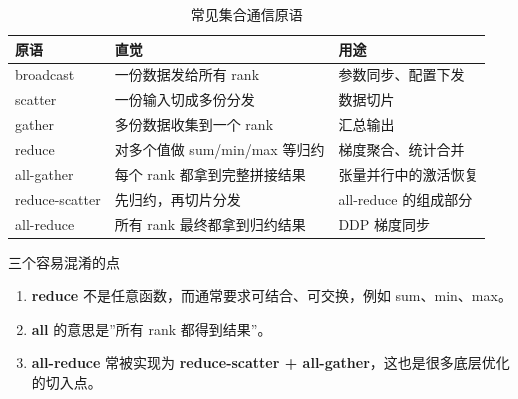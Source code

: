 \begin{table}[H]
\centering
\small
\begin{tabular}{lll}
\toprule
\textbf{原语} & \textbf{直觉} & \textbf{用途} \\
\midrule
broadcast & 一份数据发给所有 rank & 参数同步、配置下发 \\
scatter & 一份输入切成多份分发 & 数据切片 \\
gather & 多份数据收集到一个 rank & 汇总输出 \\
reduce & 对多个值做 sum/min/max 等归约 & 梯度聚合、统计合并 \\
all-gather & 每个 rank 都拿到完整拼接结果 & 张量并行中的激活恢复 \\
reduce-scatter & 先归约，再切片分发 & all-reduce 的组成部分 \\
all-reduce & 所有 rank 最终都拿到归约结果 & DDP 梯度同步 \\
\bottomrule
\end{tabular}
\caption{常见集合通信原语}
\end{table}

\begin{importantbox}{三个容易混淆的点}
\begin{enumerate}
    \item \textbf{reduce} 不是任意函数，而通常要求可结合、可交换，例如 sum、min、max。
    \item \textbf{all} 的意思是”所有 rank 都得到结果”。
    \item \textbf{all-reduce} 常被实现为 \textbf{reduce-scatter + all-gather}，这也是很多底层优化的切入点。
\end{enumerate}
\end{importantbox}

